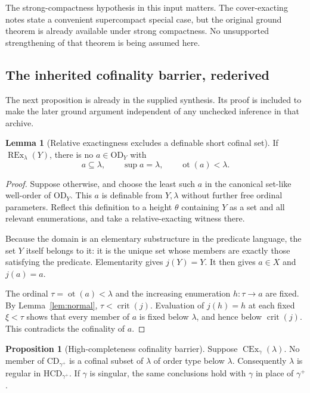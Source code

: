 \documentclass[11pt,letterpaper]{article}
\theoremstyle{definition}
\newtheorem{proposition}[definition]{Proposition}
\newtheorem{lemma}[definition]{Lemma}
\numberwithin{equation}{section}
\newcommand{\OD}{\mathrm{OD}}
\newcommand{\CD}{\mathrm{CD}}
\newcommand{\HCD}{\mathrm{HCD}}
\newcommand{\CEx}{\operatorname{CEx}}
\newcommand{\REx}{\operatorname{REx}}
\newcommand{\crit}{\operatorname{crit}}
\newcommand{\ot}{\operatorname{ot}}
\begin{document}
The strong-compactness hypothesis in this input matters. The cover-exacting notes state a convenient supercompact special case, but the original ground theorem is already available under strong compactness. No unsupported strengthening of that theorem is being assumed here.

\subsection{The inherited cofinality barrier, rederived}

The next proposition is already in the supplied synthesis. Its proof is included to make the later ground argument independent of any unchecked inference in that archive.

\begin{lemma}[Relative exactingness excludes a definable short cofinal set]\label{lem:relative-short}
If $\REx_\lambda(Y)$, there is no $a\in\OD_Y$ with
\[
a\subseteq\lambda,\qquad\sup a=\lambda,\qquad\ot(a)<\lambda.
\]
\end{lemma}

\begin{proof}
Suppose otherwise, and choose the least such $a$ in the canonical set-like well-order of $\OD_Y$. This $a$ is definable from $Y,\lambda$ without further free ordinal parameters. Reflect this definition to a height $\theta$ containing $Y$ as a set and all relevant enumerations, and take a relative-exacting witness there.

Because the domain is an elementary substructure in the predicate language, the set $Y$ itself belongs to it: it is the unique set whose members are exactly those satisfying the predicate. Elementarity gives $j(Y)=Y$. It then gives $a\in X$ and $j(a)=a$.

The ordinal $\tau=\ot(a)<\lambda$ and the increasing enumeration $h:\tau\to a$ are fixed. By Lemma~\ref{lem:normal}, $\tau<\crit(j)$. Evaluation of $j(h)=h$ at each fixed $\xi<\tau$ shows that every member of $a$ is fixed below $\lambda$, and hence below $\crit(j)$. This contradicts the cofinality of $a$.
\end{proof}

\begin{proposition}[High-completeness cofinality barrier]\label{prop:barrier}
Suppose $\CEx_\gamma(\lambda)$. No member of $\CD_{\gamma^+}$ is a cofinal subset of $\lambda$ of order type below $\lambda$. Consequently $\lambda$ is regular in $\HCD_{\gamma^+}$. If $\gamma$ is singular, the same conclusions hold with $\gamma$ in place of $\gamma^+$.
\end{proposition}
\end{document}
